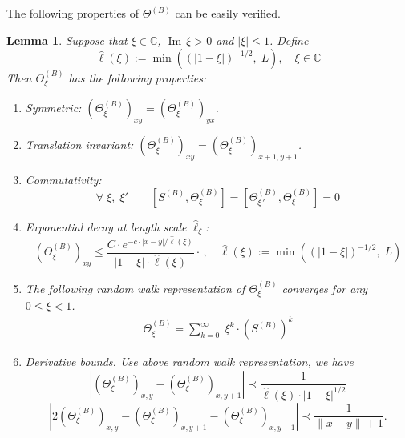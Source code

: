 \documentclass[10pt,reqno]{article}
\DeclareMathOperator{\im}{{\mathrm{Im}}}
\theoremstyle{plain} %
\newtheorem{lemma}[theorem]{Lemma}
\theoremstyle{remark}
\numberwithin{equation}{section}
\begin{document}
The following properties of $ \Theta^{(B)}$ can be easily verified. 
\begin{lemma}\label{lem_propTH}
Suppose that  $\xi\in \mathbb C$, $\im \,\xi>0$ and $|\xi|\le 1$.  Define
$$
 \hat{\ell}(\xi) := \min\left((|1-\xi|)^{-1/2},\; L\right),\quad \xi\in \mathbb C 
$$
Then  $\Theta^{(B)}_\xi$ has the following properties:
\begin{enumerate}
    \item Symmetric: $ (\Theta^{(B)}_{\xi})_{xy}= (\Theta^{(B)}_{\xi})_{yx}$.
    \item Translation invariant: $
    (\Theta^{(B)}_{\xi})_{xy}= (\Theta^{(B)}_{\xi})_{x+1, y+1}$.
    \item Commutativity:  
    $$
    \forall \;  \xi, \; \xi' \quad \quad  [S^{(B)}, \Theta^{(B)}_{\xi}]=[\Theta^{(B)}_{\xi\,'}, \Theta^{(B)}_{\xi}]=0
    $$
     \item Exponential decay at length scale $\hat \ell_\xi $:
     \begin{equation}\label{prop:ThfadC}     (\Theta^{(B)}_{\xi})_{xy}\le \frac{C\cdot e^{-c\cdot|x-y|\big/ \hat{\ell}(\xi)}}{|1-\xi|\cdot \hat \ell (\xi)}   \cdot  \,,\quad   \hat{\ell}(\xi) := \min\left((|1-\xi|)^{-1/2},\; L\right)  
     \end{equation}
     
     \item The following  random walk representation of $\Theta_\xi^{(B)}$ converges for any $ 0 \le \xi < 1$.
     \begin{align}\nonumber
     \Theta_\xi^{(B)}=\sum_{k=0}^{\infty}\;  \xi^k \cdot \left(S^{(B)}\right)^k
     \end{align} 

     
     \item Derivative bounds.   Use above random walk representation,    we have 
     \begin{equation}\label{prop:BD1}     
    \left| (\Theta^{(B)}_{\xi})_{x, y}-(\Theta^{(B)}_{\xi})_{x,{y+1}}\right|\prec \frac{1}{\hat{ \ell}(\xi)\cdot |1-\xi|^{1/2} }   
     \end{equation}
 \begin{equation}\label{prop:BD2}     
     \left|2 (\Theta^{(B)}_{\xi})_{x, y}-(\Theta^{(B)}_{\xi})_{x,{y+1}}-(\Theta^{(B)}_{\xi})_{x,{y-1}}\right|\prec  \frac{1}{\|x-y\|+1 } . 
     \end{equation}
\end{enumerate}
\end{lemma}

 
\end{document}
